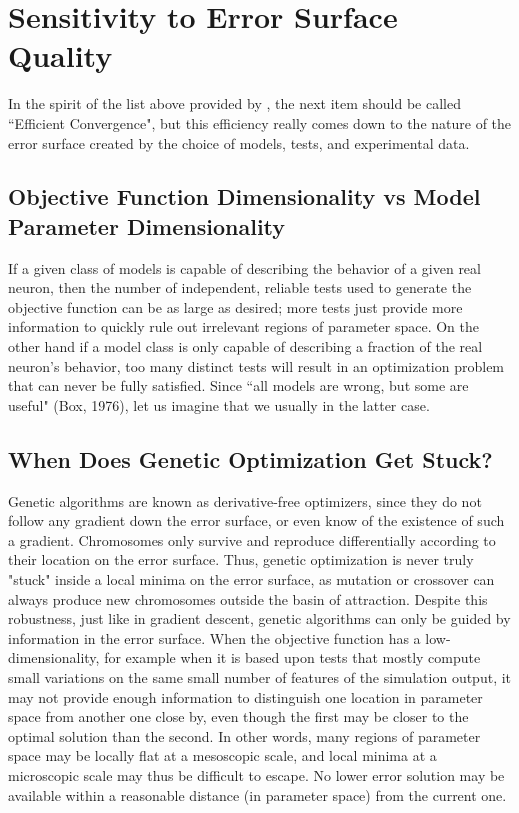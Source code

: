 \section{Sensitivity to Error Surface Quality}
In the spirit of the list above provided by \cite{van2007neurofitter}, the next item should be called ``Efficient Convergence", but this efficiency really comes down to the nature of the error surface created by the choice of models, tests, and experimental data.

\subsection{Objective Function Dimensionality vs Model Parameter Dimensionality}
If a given class of models is capable of describing the behavior of a given real neuron, then the number of independent, reliable tests used to generate the objective function can be as large as desired; more tests just provide more information to quickly rule out irrelevant regions of parameter space.
On the other hand if a model class is only capable of describing a fraction of the real neuron's behavior, too many distinct tests will result in an optimization problem that can never be fully satisfied.
Since ``all models are wrong, but some are useful" (Box, 1976), let us imagine that we usually in the latter case.

\subsection{When Does Genetic Optimization Get Stuck?}
Genetic algorithms are known as derivative-free optimizers, since they do not follow any gradient down the error surface, or even know of the existence of such a gradient.
Chromosomes only survive and reproduce differentially according to their location on the error surface.
Thus, genetic optimization is never truly "stuck" inside a local minima on the error surface, as mutation or crossover can always produce new chromosomes outside the basin of attraction.
Despite this robustness, just like in gradient descent, genetic algorithms can only be guided by information in the error surface.
When the objective function has a low-dimensionality, for example when it is based upon tests that mostly compute small variations on the same small number of features of the simulation output, it may not provide enough information to distinguish one location in parameter space from another one close by, even though the first may be closer to the optimal solution than the second.
In other words, many regions of parameter space may be locally flat at a mesoscopic scale, and local minima at a microscopic scale may thus be difficult to escape.
No lower error solution may be available within a reasonable distance (in parameter space) from the current one.

